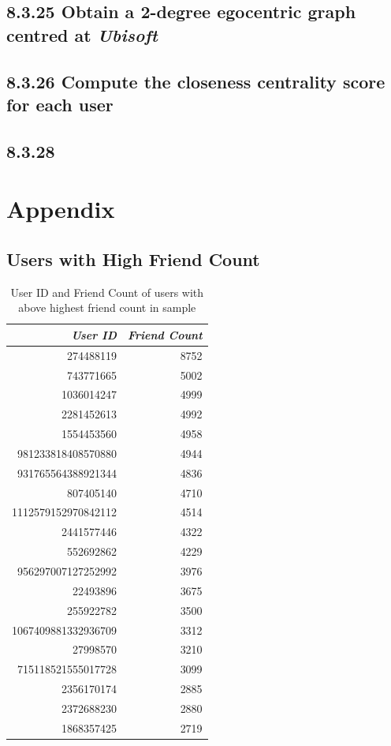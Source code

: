 \documentclass[11pt]{article}
\begin{document}
\subsection{8.3.25 Obtain a \textbf{2-degree} egocentric graph centred at \emph{Ubisoft}}
\label{sec:org7d05da6}
\subsection{8.3.26 Compute the \textbf{closeness} centrality score for each user}
\label{sec:orgf8b869f}
\subsection{8.3.28}
\label{sec:org38d6a7b}
\section{Appendix}
\label{sec:org1ed9478}
\subsection{Users with High Friend Count}
\label{sec:org07a89f5}

\begin{table}[htbp]
\caption{\label{tab:org577f989}User ID and Friend Count of users with above highest friend count in sample}
\centering
\begin{tabular}{rr}
\textbf{\emph{User ID}} & \textbf{\emph{Friend Count}}\\
\hline
274488119 & 8752\\
743771665 & 5002\\
1036014247 & 4999\\
2281452613 & 4992\\
1554453560 & 4958\\
981233818408570880 & 4944\\
931765564388921344 & 4836\\
807405140 & 4710\\
1112579152970842112 & 4514\\
2441577446 & 4322\\
552692862 & 4229\\
956297007127252992 & 3976\\
22493896 & 3675\\
255922782 & 3500\\
1067409881332936709 & 3312\\
27998570 & 3210\\
715118521555017728 & 3099\\
2356170174 & 2885\\
2372688230 & 2880\\
1868357425 & 2719\\
\end{tabular}
\end{table}
\end{document}
